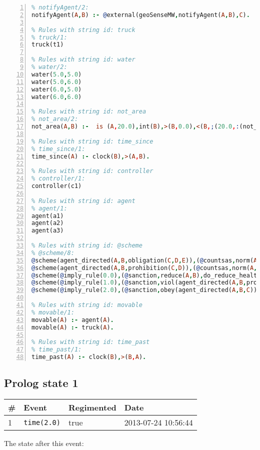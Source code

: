 \documentclass[11pt]{article}\usepackage[utf8]{inputenc}\usepackage{geometry}
\begin{document}
\begin{lstlisting}[language=Prolog, numbers=left]
% Rules with string id: notifyAgent
% notifyAgent/2:
notifyAgent(A,B) :- @external(geoSenseMW,notifyAgent(A,B),C).

% Rules with string id: truck
% truck/1:
truck(t1)

% Rules with string id: water
% water/2:
water(5.0,5.0)
water(5.0,6.0)
water(6.0,5.0)
water(6.0,6.0)

% Rules with string id: not_area
% not_area/2:
not_area(A,B) :-  is (A,20.0),int(B),>(B,0.0),<(B,;(20.0,:(not_area(A,B), is (-(B),20.0)))),int(A),>(A,0.0),<(A,;(20.0,:(area(A,B),-(int(A))))),int(B),>(A,0.0),>(B,0.0),<(A,21.0),<(B,21.0).

% Rules with string id: time_since
% time_since/1:
time_since(A) :- clock(B),>(A,B).

% Rules with string id: controller
% controller/1:
controller(c1)

% Rules with string id: agent
% agent/1:
agent(a1)
agent(a2)
agent(a3)

% Rules with string id: @scheme
% @scheme/8:
@scheme(agent_directed(A,B,obligation(C,D,E)),(@countsas,norm(A,B,F,obligation(C,D,E)),F),false,(listTrue(C)),(time_past(D)),false,[plus(viol(agent_directed(A,B,obligation(C,D,E))))|[]],[plus(obey(agent_directed(A,B,obligation(C,D,E))))|[]])
@scheme(agent_directed(A,B,prohibition(C,D)),(@countsas,norm(A,B,E,prohibition(C,D)),E),(listTrue(C)),false,(false),false,[plus(viol(agent_directed(A,B,prohibition(C,D))))|[]],[plus(obey(agent_directed(A,B,prohibition(C,D))))|[]])
@scheme(@imply_rule(0.0),(@sanction,reduce(A,B),do_reduce_health(A,B),notifyAgent(A,changed(status))),true,false,false,false,[min(reduce(A,B))|[]],[])
@scheme(@imply_rule(1.0),(@sanction,viol(agent_directed(A,B,prohibition(C,D))),do_sanction(D)),true,false,false,false,[min(viol(agent_directed(A,B,prohibition(C,D))))|[]],[])
@scheme(@imply_rule(2.0),(@sanction,obey(agent_directed(A,B,C))),true,false,false,false,[min(obey(agent_directed(A,B,C)))|[]],[])

% Rules with string id: movable
% movable/1:
movable(A) :- agent(A).
movable(A) :- truck(A).

% Rules with string id: time_past
% time_past/1:
time_past(A) :- clock(B),>(B,A).

\end{lstlisting}
\clearpage 
\subsection{Prolog state 1}
\begin{table}[ht]
\centering 
\begin{tabular}{l l l l} 
\textbf{\#} & \textbf{Event} & \textbf{Regimented} & \textbf{Date} \\ [0.5ex] 
\hline
1&\texttt{time(2.0)}&true&2013-07-24 10:56:44\\ [1ex] \hline\end{tabular}
\end{table}
The state after this event:
\end{document}
